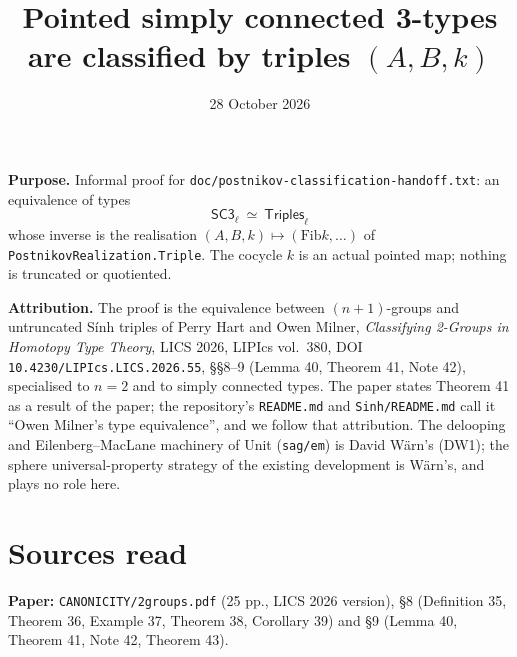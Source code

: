 \documentclass[11pt]{amsart}
\title{Pointed simply connected 3-types are classified by triples $(A,B,k)$}
\date{28 October 2026}
\theoremstyle{definition}
\theoremstyle{remark}
\newcommand{\code}[1]{\texttt{#1}}
\newcommand{\Fib}{\mathrm{Fib}}
\newcommand{\SC}{\mathsf{SC3}}
\newcommand{\Tri}{\mathsf{Triples}}
\begin{document}
\maketitle

\noindent\textbf{Purpose.} Informal proof for
\code{doc/postnikov-classification-handoff.txt}: an equivalence of types
\[ \SC_\ell\ \simeq\ \Tri_\ell \]
whose inverse is the realisation $(A,B,k)\mapsto(\Fib k,\ldots)$ of
\code{PostnikovRealization.Triple}. The cocycle $k$ is an actual pointed map;
nothing is truncated or quotiented.

\noindent\textbf{Attribution.} The proof is the equivalence between
$(n{+}1)$-groups and untruncated Sính triples of Perry Hart and Owen Milner,
\emph{Classifying 2-Groups in Homotopy Type Theory}, LICS 2026, LIPIcs vol.~380,
DOI \code{10.4230/LIPIcs.LICS.2026.55}, \S\S8--9 (Lemma 40, Theorem 41, Note 42),
specialised to $n=2$ and to simply connected types. The paper states Theorem 41 as a
result of the paper; the repository's \code{README.md} and \code{Sinh/README.md}
call it ``Owen Milner's type equivalence'', and we follow that attribution. The
delooping and Eilenberg--MacLane machinery of Unit (\code{sag/em}) is David
Wärn's (DW1); the sphere universal-property strategy of the existing
development is Wärn's, and plays no role here.

\section{Sources read}

\noindent\textbf{Paper:} \code{CANONICITY/2groups.pdf} (25 pp., LICS 2026 version),
\S8 (Definition 35, Theorem 36, Example 37, Theorem 38, Corollary 39) and \S9
(Lemma 40, Theorem 41, Note 42, Theorem 43).
\end{document}

